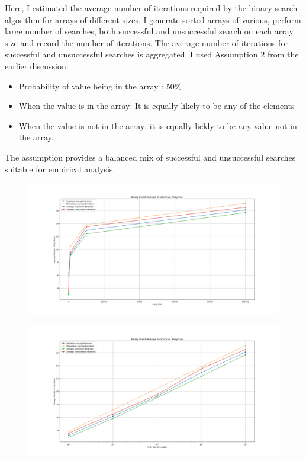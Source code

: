 \documentclass{article}
\begin{document}
Here, I estimated the average number of iterations required by the binary search algorithm for arrays of different sizes. I generate sorted arrays of various, perform large number of searches, both successful and unsuccessful search on each array size and record the number of iterations. The average number of iterations for successful and unsuccessful searches is aggregated. I used Assumption 2 from the earlier discussion:
\begin{itemize}
    \item Probability of value being in the array : 50\%
    \item When the value is in the array: It is equally likely to be any of the elements
    \item When the value is not in the array: it is equally liekly to be any value not in the array.
\end{itemize}

The assumption provides a balanced mix of successful and unsuccessful searches suitable for empirical analysis.
\begin{figure}
\centering
\includegraphics[scale=0.25]{not_log.png}
\end{figure}

\begin{figure}
\centering
\includegraphics[scale=0.25]{log.png}
\end{figure}
\end{document}
